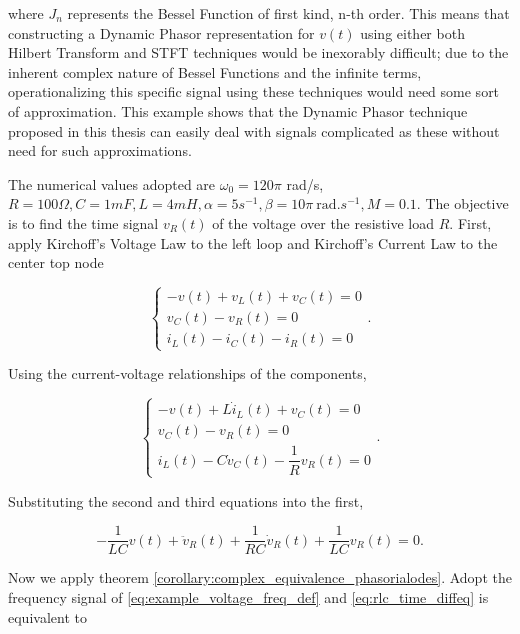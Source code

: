 \begin{example}
	\noindent where $J_n$ represents the Bessel Function of first kind, n-th order. This means that constructing a Dynamic Phasor representation for $v(t)$ using either both Hilbert Transform and STFT techniques would be inexorably difficult; due to the inherent complex nature of Bessel Functions and the infinite terms, operationalizing this specific signal using these techniques would need some sort of approximation. This example shows that the Dynamic Phasor technique proposed in this thesis can easily deal with signals complicated as these without need for such approximations.

	The numerical values adopted are $\omega_0=120\pi$ rad/s, $R = 100\Omega,C = 1mF,L = 4mH, \alpha=5s^{-1},\beta=10\pi\ \text{rad}.s^{-1},M=0.1 $. The objective is to find the time signal $v_R(t)$ of the voltage over the resistive load $R$. First, apply Kirchoff's Voltage Law to the left loop and Kirchoff's Current Law to the center top node

\begin{equation} \left\{\begin{array}{l} -v(t) + v_L(t) + v_C(t) = 0 \\[3mm] v_C(t) - v_R(t) = 0 \\[3mm] i_L(t) - i_C(t) - i_R(t) = 0 \end{array}\right. .\end{equation}

	Using the current-voltage relationships of the components,

\begin{equation} \left\{\begin{array}{l} -v(t) + L\dot{i}_L(t) + v_C(t) = 0 \\[3mm] v_C(t) - v_R(t) = 0 \\[2mm] i_L(t) - C\dot{v}_C(t) - \dfrac{1}{R}v_R(t) = 0 \end{array}\right. .\end{equation}

	Substituting the second and third equations into the first,

\begin{equation} - \dfrac{1}{LC} v(t) + \ddot{v}_R(t) + \dfrac{1}{RC}\dot{v}_R(t) + \dfrac{1}{LC} v_R(t) = 0 . \label{eq:rlc_time_diffeq}\end{equation}

	Now we apply theorem \ref{corollary:complex_equivalence_phasorialodes}. Adopt the frequency signal of \eqref{eq:example_voltage_freq_def} and \eqref{eq:rlc_time_diffeq} is equivalent to


\end{example}
